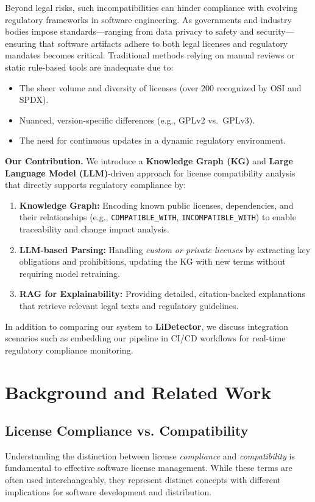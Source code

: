 \documentclass[9pt,twocolumn]{article}
\begin{document}
Beyond legal risks, such incompatibilities can hinder compliance with evolving regulatory frameworks in software engineering. As governments and industry bodies impose standards—ranging from data privacy to safety and security—ensuring that software artifacts adhere to both legal licenses and regulatory mandates becomes critical. Traditional methods relying on manual reviews or static rule-based tools are inadequate due to:
\begin{itemize}
    \item The sheer volume and diversity of licenses (over 200 recognized by OSI and SPDX).
    \item Nuanced, version-specific differences (e.g., GPLv2 vs.\ GPLv3).
    \item The need for continuous updates in a dynamic regulatory environment.
\end{itemize}

\textbf{Our Contribution.} We introduce a \textbf{Knowledge Graph (KG)} and \textbf{Large Language Model (LLM)}-driven approach for license compatibility analysis that directly supports regulatory compliance by:
\begin{enumerate}
    \item \textbf{Knowledge Graph:} Encoding known public licenses, dependencies, and their relationships (e.g., \texttt{COMPATIBLE\_WITH}, \texttt{INCOMPATIBLE\_WITH}) to enable traceability and change impact analysis.
    \item \textbf{LLM-based Parsing:} Handling \emph{custom or private licenses} by extracting key obligations and prohibitions, updating the KG with new terms without requiring model retraining.
    \item \textbf{RAG for Explainability:} Providing detailed, citation-backed explanations that retrieve relevant legal texts and regulatory guidelines.
\end{enumerate}
In addition to comparing our system to \textbf{LiDetector}, we discuss integration scenarios such as embedding our pipeline in CI/CD workflows for real-time regulatory compliance monitoring.

\section{Background and Related Work}
\label{sec:related}

\subsection{License Compliance vs. Compatibility}
Understanding the distinction between license \emph{compliance} and \emph{compatibility} is fundamental to effective software license management. While these terms are often used interchangeably, they represent distinct concepts with different implications for software development and distribution.
\end{document}

